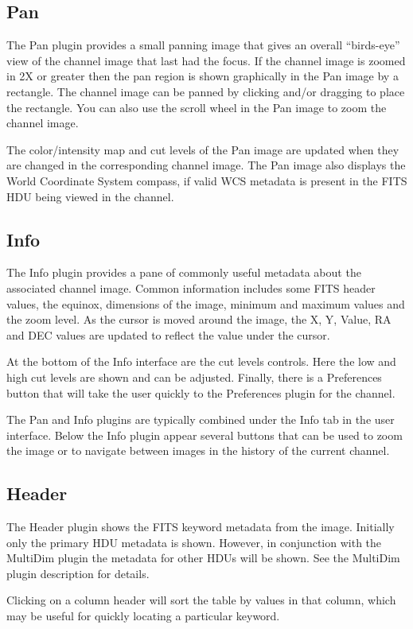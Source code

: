 \documentclass[11pt]{report}
\begin{document}
\subsection{Pan}
The Pan plugin provides a small panning image that gives an overall
``birds-eye'' view of the channel image that last had the focus.  If the
channel image is zoomed in 2X or greater then the pan region is shown
graphically in the Pan image by a rectangle.  The channel image can be
panned by clicking and/or dragging to place the rectangle.  You can also
use the scroll wheel in the Pan image to zoom the channel image.

The color/intensity map and cut levels of the Pan image are updated
when they are changed in the corresponding channel image.
The Pan image also displays the World Coordinate System compass, if
valid WCS metadata is present in the FITS HDU being viewed in the
channel.

\subsection{Info}
The Info plugin provides a pane of commonly useful metadata about the
associated channel image.  Common information includes some
FITS header values, the equinox, dimensions of the image, minimum and
maximum values and the zoom level.  As the cursor is moved around the
image, the X, Y, Value, RA and DEC values are updated to reflect the
value under the cursor.

At the bottom of the Info interface are the cut levels controls. Here
the low and high cut levels are shown and can be adjusted.  Finally,
there is a Preferences button that will take the user quickly to the
Preferences plugin for the channel.

The Pan and Info plugins are typically combined under the Info tab in
the user interface.  Below the Info plugin appear several buttons that
can be used to zoom the image or to navigate between images in the
history of the current channel.

\subsection{Header}
The Header plugin shows the FITS keyword metadata from the image.
Initially only the primary HDU metadata is shown.  However, in
conjunction with the MultiDim plugin the metadata for other HDUs will be
shown.  See the MultiDim plugin description for details.

Clicking on a column header will sort the table by values in that
column, which may be useful for quickly locating a particular keyword.
\end{document}
